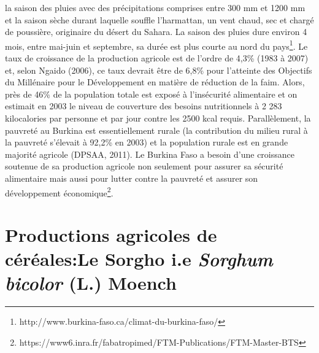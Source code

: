 \documentclass[a4paper,11pt]{article}
\begin{document}
la saison des pluies avec des précipitations comprises entre 300 mm et
1200 mm et la saison sèche durant laquelle souffle l’harmattan, un
vent chaud, sec et chargé de poussière, originaire du désert du
Sahara. La saison des pluies dure environ 4 mois, entre mai-juin et
septembre, sa durée est plus courte au nord du
pays\footnote{http://www.burkina-faso.ca/climat-du-burkina-faso/}. Le
taux de croissance de la production agricole est de l’ordre de 4,3\%
(1983 à 2007) et, selon Ngaido (2006), ce taux devrait être de 6,8\%
pour l’atteinte des Objectifs du Millénaire pour le Développement en
matière de réduction de la faim. Alors, près de 46\% de la population
totale est exposé à l’insécurité alimentaire et on estimait en 2003 le
niveau de couverture des besoins nutritionnels à 2 283 kilocalories
par personne et par jour contre les 2500 kcal requis. Parallèlement,
la pauvreté au Burkina est essentiellement rurale
(la contribution du milieu rural à la
pauvreté s’élevait à 92,2\% en 2003) et la population rurale est en
grande majorité agricole (DPSAA, 2011).  Le Burkina Faso a besoin
d’une croissance soutenue de sa production agricole non seulement pour
assurer sa sécurité alimentaire mais aussi pour lutter contre la
pauvreté et assurer son développement économique\footnote{https://www6.inra.fr/fabatropimed/FTM-Publications/FTM-Master-BTS}.

\section{Productions agricoles de céréales:Le Sorgho i.e \emph{Sorghum bicolor} (L.) Moench}


\end{document}
